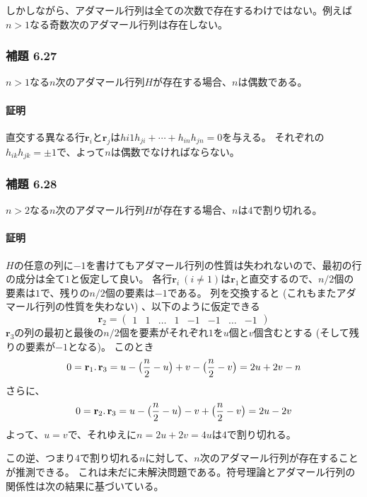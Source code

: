 \documentclass[12pt,a4paper]{article}
\begin{document}
      しかしながら、アダマール行列は全ての次数で存在するわけではない。例えば$n > 1$なる奇数次のアダマール行列は存在しない。

    \subsubsection*{補題 6.27}
      $n > 1$なる$n$次のアダマール行列$H$が存在する場合、$n$は偶数である。

      \paragraph{証明}
        直交する異なる行$\mathbf{r}_i$と$\mathbf{r}_j$は$h{i1}h_{ji} + \cdots + h_{in}h_{jn} = 0$を与える。
        それぞれの$h_{ik}h_{jk} = \pm1$で、よって$n$は偶数でなければならない。

    \subsubsection*{補題 6.28}
      $n > 2$なる$n$次のアダマール行列$H$が存在する場合、$n$は$4$で割り切れる。

      \paragraph{証明}
        $H$の任意の列に$-1$を書けてもアダマール行列の性質は失われないので、最初の行の成分は全て$1$と仮定して良い。
        各行$\mathbf{r}_i \ (i \neq 1)$は$\mathbf{r}_1$と直交するので、$n/2$個の要素は$1$で、残りの$n/2$個の要素は$-1$である。
        列を交換すると (これもまたアダマール行列の性質を失わない) 、以下のように仮定できる
        \[ \mathbf{r}_2 = \begin{pmatrix} 1 & 1 & \ldots & 1 & -1 & -1 & \ldots & -1 \end{pmatrix} \]
        $\mathbf{r}_3$の列の最初と最後の$n/2$個を要素がそれぞれ$1$を$u$個と$v$個含むとする (そして残りの要素が$-1$となる)。 このとき
        \[0 = \mathbf{r}_1 \ldotp \mathbf{r}_3 = u - \big( \frac n2 - u \big) + v - \big( \frac n2 - v \big) = 2u + 2v - n\]
        さらに、
        \[ 0 = \mathbf{r}_2 \ldotp \mathbf{r}_3 = u - \big( \frac n2 - u \big) - v + \big( \frac n2 - v \big) = 2u - 2v \]
        よって、$u = v$で、それゆえに$n = 2u + 2v = 4u$は$4$で割り切れる。
        
      この逆、つまり$4$で割り切れる$n$に対して、$n$次のアダマール行列が存在することが推測できる。
      これは未だに未解決問題である。符号理論とアダマール行列の関係性は次の結果に基づいている。
\end{document}

